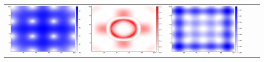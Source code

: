 \documentclass{article}
\numberwithin{equation}{section}
\begin{document}
\begin{table}
\begin{tabularx}{\textwidth}{| X | p{} p{} || p{} p{} |}
      \parbox[c]{.18\textwidth}{\includegraphics[scale=0.2]{figures/heatmaps/variance-smoothness-16.png}} &
      \parbox[c]{.18\textwidth}{\includegraphics[scale=0.2]{figures/heatmaps/error-smoothness-25.png}} &
      \parbox[c]{.18\textwidth}{\includegraphics[scale=0.2]{figures/heatmaps/variance-smoothness-25.png}} \\

\end{tabularx}
\end{table}
\end{document}
